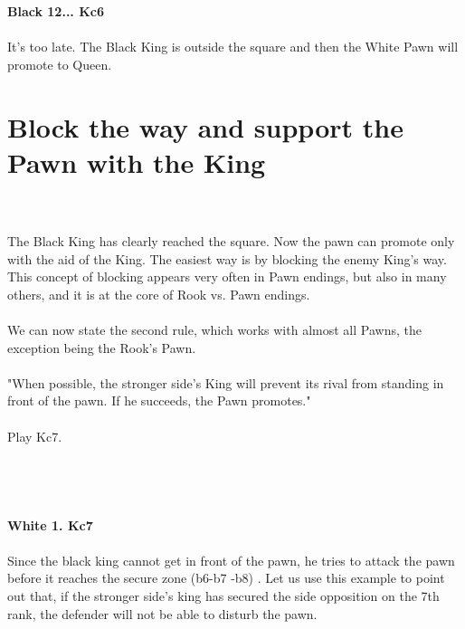 \documentclass{article}
\begin{document}

\\
\\
\textbf{Black 12... Kc6}\\
\\
It's too late. The Black King is outside the square and then the White Pawn will promote to Queen.\\\section{ Block the way and support the Pawn with the King}

\\
\\
The Black King has clearly reached the square. Now the pawn can promote only with the aid of the King. The easiest way is by blocking the enemy King's way. This concept of blocking appears very often in Pawn endings, but also in many others, and it is at the core of Rook vs. Pawn endings.\\\\We can now state the second rule, which works with almost all Pawns, the exception being the Rook's Pawn.\\\\"When possible, the stronger side's King will prevent its rival from standing in front of the pawn. If he succeeds, the Pawn promotes."\\\\Play Kc7.\\\\
\\

\\
\\
\textbf{White 1. Kc7}\\
\\
Since the black king cannot get in front of the pawn, he tries to attack the pawn before it reaches the secure zone (b6-b7 -b8) . Let us use this example to point out that, if the stronger side's king has secured the side opposition on the 7th rank, the defender will not be able to disturb the pawn.\\\\
\\

\\
\\
\end{document}
